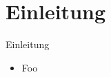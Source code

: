\section*{Einleitung}

\begin{frame}{Einleitung}
    \begin{itemize}
        \item Foo
    \end{itemize}
\end{frame}
